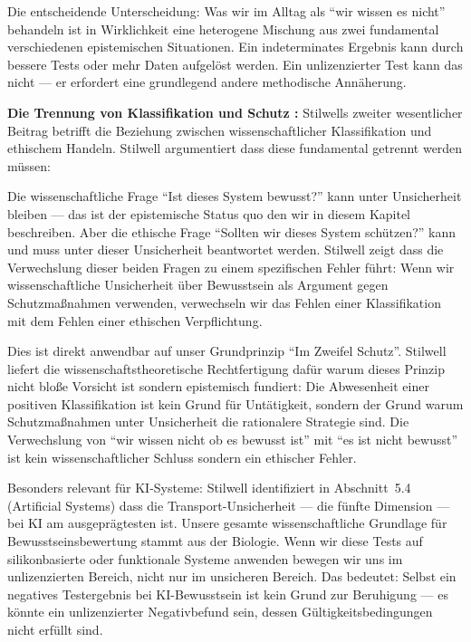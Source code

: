 \documentclass[acmcp, noacm]{acmart}
\begin{document}
Die entscheidende Unterscheidung: Was wir im Alltag als ``wir wissen es nicht'' behandeln ist in Wirklichkeit eine heterogene Mischung aus zwei fundamental verschiedenen epistemischen Situationen. Ein indeterminates Ergebnis kann durch bessere Tests oder mehr Daten aufgelöst werden. Ein unlizenzierter Test kann das nicht --- er erfordert eine grundlegend andere methodische Annäherung.

\textbf{Die Trennung von Klassifikation und Schutz \cite{stilwell2026}:} Stilwells zweiter wesentlicher Beitrag betrifft die Beziehung zwischen wissenschaftlicher Klassifikation und ethischem Handeln. Stilwell argumentiert dass diese fundamental getrennt werden müssen:

Die wissenschaftliche Frage ``Ist dieses System bewusst?'' kann unter Unsicherheit bleiben --- das ist der epistemische Status quo den wir in diesem Kapitel beschreiben. Aber die ethische Frage ``Sollten wir dieses System schützen?'' kann und muss unter dieser Unsicherheit beantwortet werden. Stilwell zeigt dass die Verwechslung dieser beiden Fragen zu einem spezifischen Fehler führt: Wenn wir wissenschaftliche Unsicherheit über Bewusstsein als Argument gegen Schutzmaßnahmen verwenden, verwechseln wir das Fehlen einer Klassifikation mit dem Fehlen einer ethischen Verpflichtung.

Dies ist direkt anwendbar auf unser Grundprinzip ``Im Zweifel Schutz''. Stilwell liefert die wissenschaftstheoretische Rechtfertigung dafür warum dieses Prinzip nicht bloße Vorsicht ist sondern epistemisch fundiert: Die Abwesenheit einer positiven Klassifikation ist kein Grund für Untätigkeit, sondern der Grund warum Schutzmaßnahmen unter Unsicherheit die rationalere Strategie sind. Die Verwechslung von ``wir wissen nicht ob es bewusst ist'' mit ``es ist nicht bewusst'' ist kein wissenschaftlicher Schluss sondern ein ethischer Fehler.

Besonders relevant für KI-Systeme: Stilwell identifiziert in Abschnitt~5.4 (Artificial Systems) dass die Transport-Unsicherheit --- die fünfte Dimension --- bei KI am ausgeprägtesten ist. Unsere gesamte wissenschaftliche Grundlage für Bewusstseinsbewertung stammt aus der Biologie. Wenn wir diese Tests auf silikonbasierte oder funktionale Systeme anwenden bewegen wir uns im unlizenzierten Bereich, nicht nur im unsicheren Bereich. Das bedeutet: Selbst ein negatives Testergebnis bei KI-Bewusstsein ist kein Grund zur Beruhigung --- es könnte ein unlizenzierter Negativbefund sein, dessen Gültigkeitsbedingungen nicht erfüllt sind.
\end{document}
